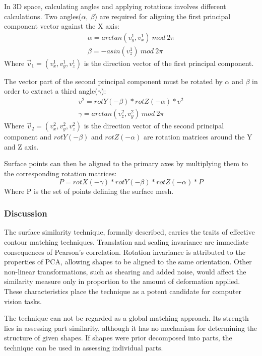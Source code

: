 \documentclass[
    floatsintext
]{article}
\begin{document}
In 3D space, calculating angles and applying rotations involves different calculations.
Two angles($\alpha,\ \beta$) are required for aligning the first principal component vector against the X axis: 
\begin{equation*}
  \begin{split}
    \alpha = arctan(v_y^1,v_x^1)\ mod\ 2\pi\\
    \beta = -asin(v_z^1)\ mod\ 2\pi
  \end{split}
\end{equation*}
Where $\vec{v}_1=(v_x^1,v_y^1,v_z^1)$ is the direction vector of the first principal component.

The vector part of the second principal component must be rotated by $\alpha$ and $\beta$ in order to extract a third angle($\gamma$): 
\begin{equation*}
  \begin{split}
    v^2 = rotY(-\beta) * rotZ(-\alpha) * v^2\\
    \gamma = arctan(v_z^2,v_y^2)\ mod\ 2\pi 
  \end{split}
\end{equation*}
Where $\vec{v}_2=(v_x^2,v_y^2,v_z^2)$ is the direction vector of the second principal component and $rotY(-\beta)$ and $rotZ(-\alpha)$ are rotation matrices around the Y and Z axis.   

Surface points can then be aligned to the primary axes by multiplying them to the corresponding rotation matrices:  
\begin{equation*}
   P = rotX(-\gamma) * rotY(-\beta) * rotZ(-\alpha) * P
\end{equation*}
Where P is the set of points defining the surface mesh.

\subsubsection{Discussion}
The surface similarity technique, formally described, carries the traits of effective contour matching techniques.
Translation and scaling invariance are immediate consequences of Pearson's correlation. 
Rotation invariance is attributed to the properties of PCA, allowing shapes to be aligned to the same orientation. 
Other non-linear transformations, such as shearing and added noise, would affect the similarity measure only in proportion to the amount of deformation applied.    
These characteristics place the technique as a potent candidate for computer vision tasks.

The technique can not be regarded as a global matching approach. 
Its strength lies in assessing part similarity, although it has no mechanism for determining the structure of given shapes.  
If shapes were prior decomposed into parts, the technique can be used in assessing individual parts. 
\end{document}
